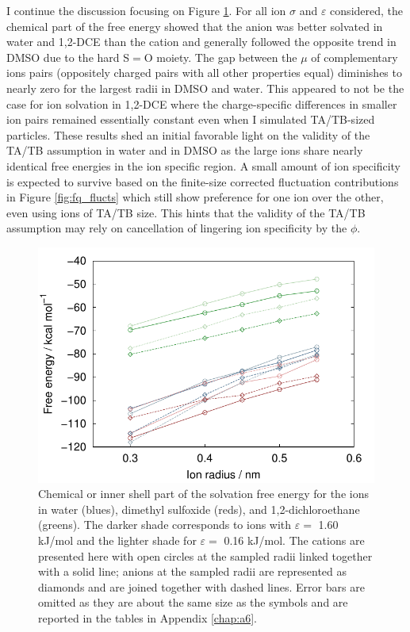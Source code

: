 \begin{tatb}
  I continue the discussion focusing on Figure \ref{fig:inner}. For all ion $\sigma$ and $\varepsilon$ considered, the chemical part of the free energy showed that 
  the anion was better solvated in water and 1,2-DCE than the cation and generally followed the opposite trend in DMSO due to the hard S$=$O moiety. The gap between the 
  $\mu$ of complementary ions pairs (oppositely charged pairs with all other properties equal) diminishes to nearly zero for the largest radii in DMSO and
  water. This appeared to not be the case for ion solvation in 1,2-DCE where the charge-specific differences in smaller ion pairs remained essentially constant even when I 
  simulated TA\sur{+}/TB\sur{-}-sized particles. These results shed an initial favorable light on the validity of the TA\sur{+}/TB\sur{-} assumption in water and in DMSO as
  the large ions share nearly identical free energies in the ion specific region. A small amount of ion specificity is expected to survive based on the finite-size corrected
  fluctuation contributions in Figure \ref{fig:fq_flucts} which still show preference for one ion over the other, even using ions of TA\sur{+}/TB\sur{-} size. This hints 
  that the validity of the TA\sur{+}/TB\sur{-} assumption may rely on cancellation of lingering ion specificity by the $\phi$.
  
\begin{figure} 
 \includegraphics[width=0.98\linewidth]{images/tatb/is.pdf}
 \caption[Inner shell (chemical) part of the solvation free energy]{\label{fig:inner}Chemical or inner shell part of the solvation free energy for the ions in water
 (blues), dimethyl sulfoxide (reds), and 1,2-dichloroethane (greens). The darker shade corresponds to ions with $\varepsilon =$ 1.60 kJ/mol and the lighter shade for
 $\varepsilon =$ 0.16 kJ/mol. The cations are presented here with open circles at the sampled radii linked together with a solid line; anions at the sampled radii are
 represented as diamonds and are joined together with dashed lines. Error bars are omitted as they are about the same size as the symbols and are reported in the tables
 in Appendix \ref{chap:a6}.}
\end{figure}


\end{tatb}

